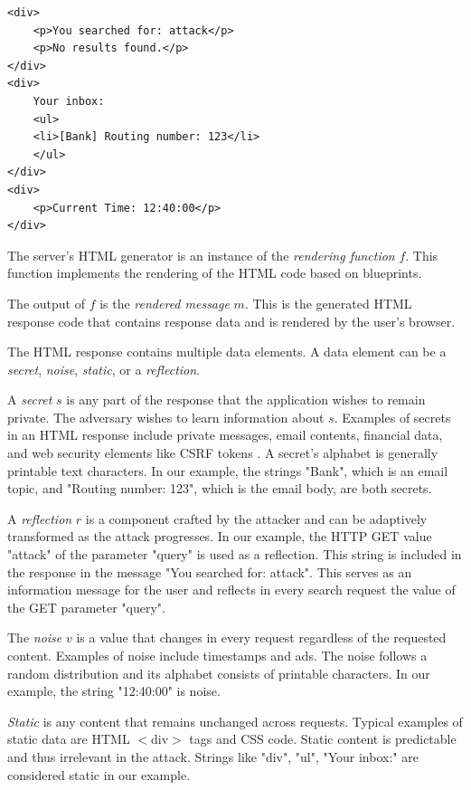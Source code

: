 \documentclass[conference, letterpaper, 10pt]{IEEEtran}
\begin{document}
\begin{lstlisting}[basicstyle=\small\ttfamily]
<div>
    <p>You searched for: attack</p>
    <p>No results found.</p>
</div>
<div>
    Your inbox:
    <ul>
    <li>[Bank] Routing number: 123</li>
    </ul>
</div>
<div>
    <p>Current Time: 12:40:00</p>
</div>
\end{lstlisting}

The server's HTML generator is an instance of the \textit{rendering function}
$f$. This function implements the rendering of the HTML code based on
blueprints.

The output of $f$ is the \textit{rendered message} $m$. This is the generated
HTML response code that contains response data and is rendered by the user's
browser.

The HTML response contains multiple data elements. A data element can be a
\textit{secret}, \textit{noise}, \textit{static}, or a \textit{reflection}.

A \textit{secret} $s$ is any part of the response that the application wishes to
remain private. The adversary wishes to learn information about $s$. Examples of
secrets in an HTML response include private messages, email contents, financial
data, and web security elements like CSRF tokens \cite{c16}. A secret's alphabet
is generally printable text characters. In our example, the strings "Bank",
which is an email topic, and "Routing number: 123", which is the email body, are
both secrets.

A \textit{reflection} $r$ is a component crafted by the attacker and can be
adaptively transformed as the attack progresses. In our example, the HTTP GET
value "attack" of the parameter "query" is used as a reflection. This string is
included in the response in the message "You searched for: attack". This serves
as an information message for the user and reflects in every search request the
value of the GET parameter "query".

The \textit{noise} $v$ is a value that changes in every request regardless of
the requested content. Examples of noise include timestamps and ads. The noise
follows a random distribution and its alphabet consists of printable characters.
In our example, the string "12:40:00" is noise.

\textit{Static} is any content that remains unchanged across requests. Typical
examples of static data are HTML $<$div$>$ tags and CSS code. Static content is
predictable and thus irrelevant in the attack. Strings like "div", "ul", "Your
inbox:" are considered static in our example.
\end{document}
